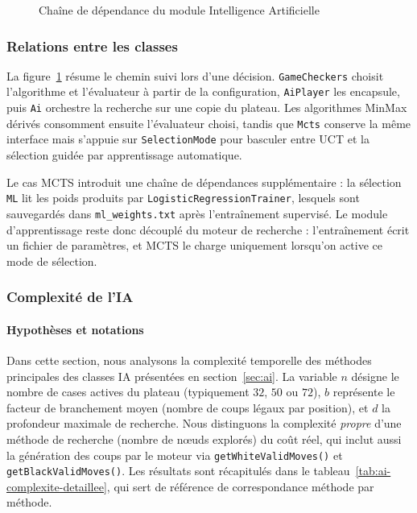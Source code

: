 \documentclass[a4paper]{article}
\begin{document}
\begin{figure}[h]
  
  \caption{Cha\^ine de d\'ependance du module Intelligence Artificielle}
  \label{fig:ia-dependencies}
\end{figure}

\subsubsection{Relations entre les classes}

La figure~\ref{fig:ia-dependencies} résume le chemin suivi lors d'une décision. \texttt{GameCheckers} choisit l'algorithme et l'évaluateur à partir de la configuration, \texttt{AiPlayer} les encapsule, puis \texttt{Ai} orchestre la recherche sur une copie du plateau. Les algorithmes MinMax dérivés consomment ensuite l'évaluateur choisi, tandis que \texttt{Mcts} conserve la même interface mais s'appuie sur \texttt{SelectionMode} pour basculer entre UCT et la sélection guidée par apprentissage automatique.

Le cas MCTS introduit une chaîne de dépendances supplémentaire : la sélection \texttt{ML} lit les poids produits par \texttt{LogisticRegressionTrainer}, lesquels sont sauvegardés dans \texttt{ml\_weights.txt} après l'entraînement supervisé. Le module d'apprentissage reste donc découplé du moteur de recherche : l'entraînement écrit un fichier de paramètres, et MCTS le charge uniquement lorsqu'on active ce mode de sélection.

\subsubsection{Complexité de l'IA}

\paragraph{Hypothèses et notations}

Dans cette section, nous analysons la complexité temporelle des méthodes principales des classes IA présentées en section~\ref{sec:ai}.
La variable $n$ désigne le nombre de cases actives du plateau (typiquement \(32\), \(50\) ou \(72\)), $b$ représente
le facteur de branchement moyen (nombre de coups légaux par position), et $d$ la profondeur maximale de recherche.
Nous distinguons la complexité \textit{propre} d'une méthode de recherche (nombre de n\oe{}uds explorés) du coût réel,
qui inclut aussi la génération des coups par le moteur via \texttt{getWhiteValidMoves()} et \texttt{getBlackValidMoves()}.
Les résultats sont récapitulés dans le tableau~\ref{tab:ai-complexite-detaillee}, qui sert de référence de correspondance méthode par méthode.
\end{document}
